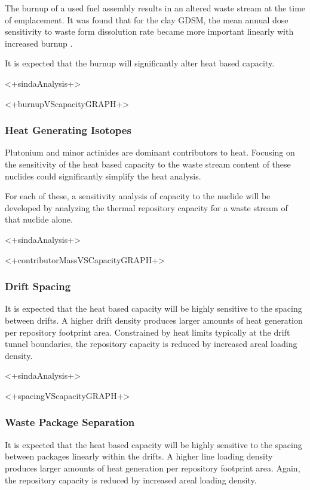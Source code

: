 The burnup of a used fuel assembly results in an altered waste stream at the 
time of emplacement. It was found that for the clay \gls{GDSM}, the mean 
annual dose sensitivity to waste form dissolution rate became more important 
linearly with increased burnup \cite{clayton_generic_2011}.

It is expected that the burnup will significantly alter heat based capacity. 

<+sindaAnalysis+>

<+burnupVScapacityGRAPH+>

\subsubsection{Heat Generating Isotopes}

Plutonium and minor actinides are dominant contributors to heat. Focusing on
the sensitivity of the heat based capacity to the waste stream content of 
these nuclides could significantly simplify the heat analysis. 
 
For each of these, a sensitivity analysis of capacity to the nuclide will be 
developed by analyzing the thermal repository capacity for a waste stream of 
that nuclide alone.  

<+sindaAnalysis+>

<+contributorMassVSCapacityGRAPH+>

\subsubsection{Drift Spacing}

It is expected that the heat based capacity will be highly sensitive to the 
spacing between drifts. A higher drift density produces larger amounts of heat 
generation per repository footprint area. Constrained by heat limits typically 
at the drift tunnel boundaries, the repository capacity is reduced by increased 
areal loading density. 

<+sindaAnalysis+>

<+spacingVScapacityGRAPH+>

\subsubsection{Waste Package Separation}

It is expected that the heat based capacity will be highly sensitive to the 
spacing between packages linearly within the drifts. A higher line loading 
density produces larger amounts of heat generation per repository footprint 
area.  Again, the repository capacity is reduced by increased areal loading 
density. 

